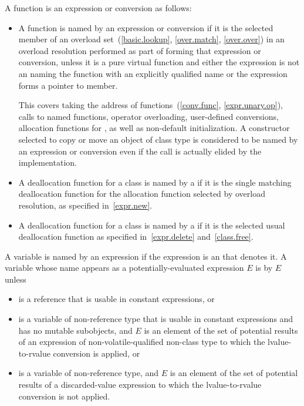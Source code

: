 \pnum
A function is 
an expression or conversion as follows:
\begin{itemize}
\item
  A function is named by an expression or conversion
  if it is the selected member
  of an overload set~(\ref{basic.lookup}, \ref{over.match}, \ref{over.over})
  in an overload resolution performed
  as part of forming that expression or conversion,
  unless it is a pure virtual function and either
  the expression is not an  naming the function with
  an explicitly qualified name or
  the expression forms a pointer to member.
  \begin{note}
This covers
  taking the address of functions~(\ref{conv.func}, \ref{expr.unary.op}),
  calls to named functions,
  operator overloading,
  user-defined conversions,
  allocation functions for , as well as
  non-default initialization.
  A constructor selected to copy or move an object of class type
  is considered to be named by an expression or conversion
  even if the call is actually elided by the implementation.
\end{note}
\item
  A deallocation function for a class
  is named by a 
  if it is the single matching deallocation function
  for the allocation function selected by overload resolution,
  as specified in~\ref{expr.new}.
\item
  A deallocation function for a class
  is named by a 
  if it is the selected usual deallocation function
  as specified in~\ref{expr.delete} and~\ref{class.free}.
\end{itemize}

\pnum
A variable is named by an expression
if the expression is an  that denotes it.
A variable  whose name appears as a
potentially-evaluated expression $E$
is  by $E$ unless
\begin{itemize}
\item
   is a reference that is
  usable in constant expressions, or
\item
   is a variable of non-reference type that is
  usable in constant expressions and has no mutable subobjects, and
  $E$ is an element of the set of potential results of an expression
  of non-volatile-qualified non-class type
  to which the lvalue-to-rvalue conversion is applied, or
\item
   is a variable of non-reference type, and
  $E$ is an element of the set of potential results
  of a discarded-value expression
  to which the lvalue-to-rvalue conversion is not applied.
\end{itemize}

